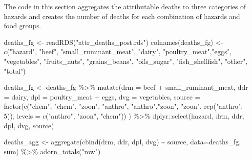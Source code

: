 \documentclass[
  letterpaper,
  DIV=11,
  numbers=noendperiod]{scrartcl}
\newenvironment{Shaded}{\begin{snugshade}}{\end{snugshade}}
\newcommand{\AttributeTok}[1]{\textcolor[rgb]{0.40,0.45,0.13}{#1}}
\newcommand{\DecValTok}[1]{\textcolor[rgb]{0.68,0.00,0.00}{#1}}
\newcommand{\FunctionTok}[1]{\textcolor[rgb]{0.28,0.35,0.67}{#1}}
\newcommand{\NormalTok}[1]{\textcolor[rgb]{0.00,0.23,0.31}{#1}}
\newcommand{\OtherTok}[1]{\textcolor[rgb]{0.00,0.23,0.31}{#1}}
\newcommand{\SpecialCharTok}[1]{\textcolor[rgb]{0.37,0.37,0.37}{#1}}
\newcommand{\StringTok}[1]{\textcolor[rgb]{0.13,0.47,0.30}{#1}}
\begin{document}
The code in this section aggregates the attributable deaths to three
categories of hazards and creates the number of deaths for each
combination of hazards and food groups.

\begin{Shaded}
\begin{Highlighting}[]
\NormalTok{deaths\_fg }\OtherTok{\textless{}{-}} \FunctionTok{readRDS}\NormalTok{(}\StringTok{"attr\_deaths\_post.rds"}\NormalTok{)}
\FunctionTok{colnames}\NormalTok{(deaths\_fg) }\OtherTok{\textless{}{-}} \FunctionTok{c}\NormalTok{(}\StringTok{"hazard"}\NormalTok{, }\StringTok{"beef"}\NormalTok{, }\StringTok{"small\_ruminant\_meat"}\NormalTok{, }\StringTok{"dairy"}\NormalTok{, }\StringTok{"poultry\_meat"}\NormalTok{,}\StringTok{"eggs"}\NormalTok{, }\StringTok{"vegetables"}\NormalTok{, }\StringTok{"fruits\_nuts"}\NormalTok{, }\StringTok{"grains\_beans"}\NormalTok{, }\StringTok{"oils\_sugar"}\NormalTok{, }\StringTok{"fish\_shellfish"}\NormalTok{, }\StringTok{"other"}\NormalTok{, }\StringTok{"total"}\NormalTok{)}

\NormalTok{deaths\_fg }\OtherTok{\textless{}{-}}\NormalTok{ deaths\_fg }\SpecialCharTok{\%\textgreater{}\%} 
  \FunctionTok{mutate}\NormalTok{(}\AttributeTok{drm =}\NormalTok{ beef }\SpecialCharTok{+}\NormalTok{ small\_ruminant\_meat,}
         \AttributeTok{ddr =}\NormalTok{ dairy,}
         \AttributeTok{dpl =}\NormalTok{ poultry\_meat }\SpecialCharTok{+}\NormalTok{ eggs,}
         \AttributeTok{dvg =}\NormalTok{ vegetables,}
         \AttributeTok{source =} \FunctionTok{factor}\NormalTok{(}\FunctionTok{c}\NormalTok{(}\StringTok{"chem"}\NormalTok{, }\StringTok{"chem"}\NormalTok{, }\StringTok{"zoon"}\NormalTok{, }\StringTok{"anthro"}\NormalTok{,}
                           \StringTok{"anthro"}\NormalTok{,}\StringTok{"zoon"}\NormalTok{, }\StringTok{"zoon"}\NormalTok{,}
                           \FunctionTok{rep}\NormalTok{(}\StringTok{"anthro"}\NormalTok{, }\DecValTok{5}\NormalTok{)),}
                    \AttributeTok{levels =} \FunctionTok{c}\NormalTok{(}\StringTok{"anthro"}\NormalTok{, }\StringTok{"zoon"}\NormalTok{, }\StringTok{"chem"}\NormalTok{))}
\NormalTok{         ) }\SpecialCharTok{\%\textgreater{}\%} 
\NormalTok{   dplyr}\SpecialCharTok{::}\FunctionTok{select}\NormalTok{(hazard, drm, ddr, dpl, dvg, source)}

\NormalTok{deaths\_agg }\OtherTok{\textless{}{-}} \FunctionTok{aggregate}\NormalTok{(}\FunctionTok{cbind}\NormalTok{(drm, ddr, dpl, dvg) }\SpecialCharTok{\textasciitilde{}}\NormalTok{ source, }\AttributeTok{data=}\NormalTok{deaths\_fg, sum) }\SpecialCharTok{\%\textgreater{}\%} 
  \FunctionTok{adorn\_totals}\NormalTok{(}\StringTok{"row"}\NormalTok{)}


\end{Highlighting}
\end{Shaded}
\end{document}
